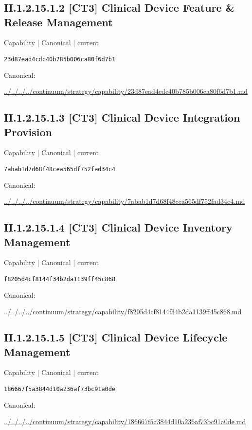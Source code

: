 \documentclass[10pt,a4paper]{article}
\begin{document}
\subsection*{II.1.2.15.1.2 [CT3] Clinical Device Feature \& Release Management}
{\small Capability | Canonical | current}\par
\texttt{23d87ead4cdc40b785b006ca80f6d7b1}\par
Canonical: \par
{\footnotesize\url{../../../../continuum/strategy/capability/23d87ead4cdc40b785b006ca80f6d7b1.md}}\par
\subsection*{II.1.2.15.1.3 [CT3] Clinical Device Integration Provision}
{\small Capability | Canonical | current}\par
\texttt{7abab1d7d68f48cea565df752fad34c4}\par
Canonical: \par
{\footnotesize\url{../../../../continuum/strategy/capability/7abab1d7d68f48cea565df752fad34c4.md}}\par
\subsection*{II.1.2.15.1.4 [CT3] Clinical Device Inventory Management}
{\small Capability | Canonical | current}\par
\texttt{f8205d4cf8144f34b2da1139ff45c868}\par
Canonical: \par
{\footnotesize\url{../../../../continuum/strategy/capability/f8205d4cf8144f34b2da1139ff45c868.md}}\par
\subsection*{II.1.2.15.1.5 [CT3] Clinical Device Lifecycle Management}
{\small Capability | Canonical | current}\par
\texttt{186667f5a3844d10a236af73bc91a0de}\par
Canonical: \par
{\footnotesize\url{../../../../continuum/strategy/capability/186667f5a3844d10a236af73bc91a0de.md}}\par
\end{document}
